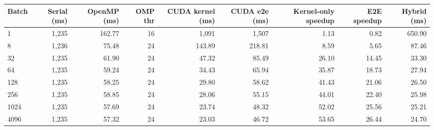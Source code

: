 \begin{tabular}{lrrrrrrrr}
\toprule
Batch & Serial (ms) & OpenMP (ms) & OMP thr & CUDA kernel (ms) & CUDA e2e (ms) & Kernel-only speedup & E2E speedup & Hybrid (ms) \\
\midrule
1 & 1,235 & 162.77 & 16 & 1,091 & 1,507 & 1.13 & 0.82 & 650.90 \\
8 & 1,236 & 75.48 & 24 & 143.89 & 218.81 & 8.59 & 5.65 & 87.46 \\
32 & 1,235 & 61.90 & 24 & 47.32 & 85.49 & 26.10 & 14.45 & 33.30 \\
64 & 1,235 & 59.24 & 24 & 34.43 & 65.94 & 35.87 & 18.73 & 27.94 \\
128 & 1,235 & 58.25 & 24 & 29.80 & 58.62 & 41.43 & 21.06 & 26.50 \\
256 & 1,235 & 58.85 & 24 & 28.06 & 55.15 & 44.01 & 22.40 & 25.98 \\
1024 & 1,235 & 57.69 & 24 & 23.74 & 48.32 & 52.02 & 25.56 & 25.21 \\
4096 & 1,235 & 57.32 & 24 & 23.03 & 46.72 & 53.65 & 26.44 & 24.70 \\
\bottomrule
\end{tabular}
